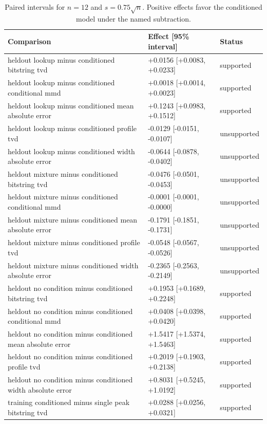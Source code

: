 \begin{table}[p]
\centering
\scriptsize
\setlength{\tabcolsep}{4pt}
\caption{Paired intervals for $n=12$ and $s=0.75\sqrt n$. Positive effects favor the conditioned model under the named subtraction.}
\label{tab:all-intervals-n12-w0.75}
\begin{tabular}{@{}p{}p{}p{}@{}}
\toprule
Comparison & Effect [95\% interval] & Status\\
\midrule
heldout lookup minus conditioned bitstring tvd & +0.0156 [+0.0083, +0.0233] & supported \\
heldout lookup minus conditioned conditional mmd & +0.0018 [+0.0014, +0.0023] & supported \\
heldout lookup minus conditioned mean absolute error & +0.1243 [+0.0983, +0.1512] & supported \\
heldout lookup minus conditioned profile tvd & -0.0129 [-0.0151, -0.0107] & unsupported \\
heldout lookup minus conditioned width absolute error & -0.0644 [-0.0878, -0.0402] & unsupported \\
heldout mixture minus conditioned bitstring tvd & -0.0476 [-0.0501, -0.0453] & unsupported \\
heldout mixture minus conditioned conditional mmd & -0.0001 [-0.0001, -0.0000] & unsupported \\
heldout mixture minus conditioned mean absolute error & -0.1791 [-0.1851, -0.1731] & unsupported \\
heldout mixture minus conditioned profile tvd & -0.0548 [-0.0567, -0.0526] & unsupported \\
heldout mixture minus conditioned width absolute error & -0.2365 [-0.2563, -0.2149] & unsupported \\
heldout no condition minus conditioned bitstring tvd & +0.1953 [+0.1689, +0.2248] & supported \\
heldout no condition minus conditioned conditional mmd & +0.0408 [+0.0398, +0.0420] & supported \\
heldout no condition minus conditioned mean absolute error & +1.5417 [+1.5374, +1.5463] & supported \\
heldout no condition minus conditioned profile tvd & +0.2019 [+0.1903, +0.2138] & supported \\
heldout no condition minus conditioned width absolute error & +0.8031 [+0.5245, +1.0192] & supported \\
training conditioned minus single peak bitstring tvd & +0.0288 [+0.0256, +0.0321] & supported \\

\end{tabular}
\end{table}
